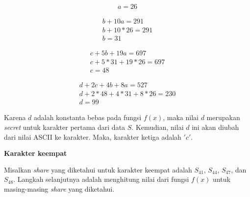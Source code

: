 \begin{gather*}
	a = 26
\end{gather*}

\begin{gather*}
	b + 10a = 291 \\
	b + 10*26 = 291 \\
	b = 31
\end{gather*}

\begin{gather*}
	c + 5b + 19a = 697 \\
	c + 5*31 + 19*26 = 697 \\
	c = 48
\end{gather*}

\begin{gather*}
	d + 2c + 4b + 8a = 527 \\
	d + 2*48 + 4*31 + 8*26 = 230 \\
	d = 99
\end{gather*}

Karena \begin{math}d\end{math} adalah konstanta bebas pada fungsi \begin{math}f(x)\end{math}, maka nilai \begin{math}d\end{math} merupakan \textit{secret} untuk karakter pertama dari data \begin{math}S\end{math}. Kemudian, nilai \begin{math}d\end{math} ini akan diubah dari nilai ASCII ke karakter. Maka, karakter ketiga adalah \begin{math}'c'\end{math}.

\begin{flushleft}
	\textbf{Karakter keempat}
\end{flushleft}

Misalkan \textit{share} yang diketahui untuk karakter keempat adalah \begin{math}S_{41}\end{math}, \begin{math}S_{44}\end{math}, \begin{math}S_{47}\end{math}, dan \begin{math}S_{48}\end{math}. Langkah selanjutnya adalah menghitung nilai dari fungsi \begin{math}f(x)\end{math} untuk masing-masing \textit{share} yang diketahui.

